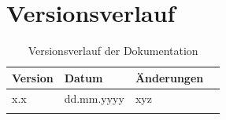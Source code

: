 \section*{Versionsverlauf}
\thispagestyle{nofooter}

\begin{longtable}{|p{2cm}|p{3cm}|p{3cm}|p{5cm}|}
	\hline
	\textbf{Version} & \textbf{Datum}& \textbf{Änderungen} \\
	\hline
	x.x              & dd.mm.yyyy          & xyz                 \\
	\hline
	\caption{Versionsverlauf der Dokumentation}
\end{longtable}